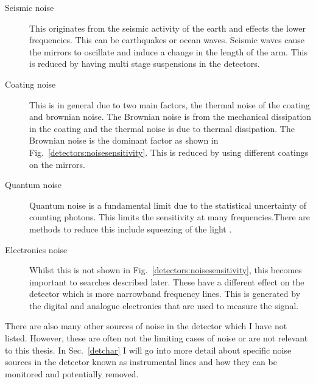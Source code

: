 \begin{description}
\item[Seismic noise] This originates from the seismic activity of the earth and effects the lower frequencies. This can be earthquakes or ocean waves. Seismic waves cause the mirrors to oscillate and induce a change in the length of the arm. This is reduced by having multi stage suspensions in the detectors.

\item[Coating noise] This is in general due to two main factors, the thermal noise of the coating and brownian noise. The Brownian noise is from the mechanical dissipation in the coating and the thermal noise is due to thermal dissipation. The Brownian noise is the dominant factor as shown in Fig.~\ref{detectors:noisesensitivity}. This is reduced by using different coatings on the mirrors.

\item[Quantum noise] Quantum noise is a fundamental limit due to the statistical uncertainty of counting photons. This limits the sensitivity at many frequencies.There are methods to reduce this include squeezing of the light \citep{}. 

\item[Electronics noise] Whilst this is not shown in Fig.~\ref{detectors:noisesensitivity}, this becomes important to searches described later. These have a different effect on the detector which is more narrowband frequency lines. This is generated by the digital and analogue electronics that are used to measure the signal. 
\end{description}

There are also many other sources of noise in the detector which I have not listed. However, these are often not the limiting cases of noise or are not relevant to this thesis.
In Sec.~\ref{detchar} I will go into more detail about specific noise sources in the detector known as instrumental lines and how they can be monitored and potentially removed. 













